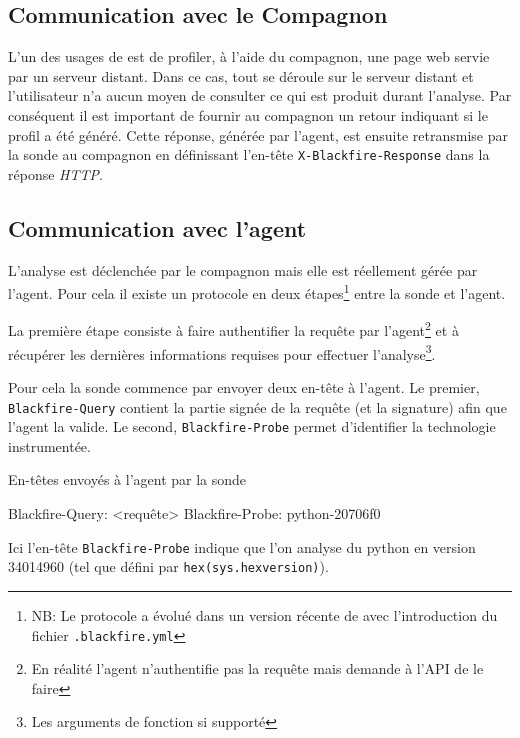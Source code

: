 			\subsection{Communication avec le Compagnon}
			\label{subsec:comm-compagnon}
L'un des usages de \Blackfire est de profiler, à l'aide du compagnon, une page web servie par un serveur distant. Dans ce cas, tout se déroule sur le serveur distant et l'utilisateur n'a aucun moyen de consulter ce qui est produit durant l'analyse. Par conséquent il est important de fournir au compagnon un retour indiquant si le profil a été généré. Cette réponse, générée par l'agent, est ensuite retransmise par la sonde au compagnon en définissant l'en-tête \verb|X-Blackfire-Response| dans la réponse \emph{HTTP}.

			\subsection{Communication avec l'agent}
			\label{subsec:comm-agent}
L'analyse est déclenchée par le compagnon mais elle est réellement gérée par l'agent. Pour cela il existe un protocole en deux étapes\footnote{NB: Le protocole a évolué dans un version récente de \Blackfire avec l'introduction du fichier \verb?.blackfire.yml?} entre la sonde et l'agent.

La première étape consiste à faire authentifier la requête par l'agent\footnote{En réalité l'agent n'authentifie pas la requête mais demande à l'API de le faire} et à récupérer les dernières informations requises pour effectuer l'analyse\footnote{Les arguments de fonction si supporté}.

Pour cela la sonde commence par envoyer deux en-tête à l'agent. Le premier, \verb|Blackfire-Query| contient la partie signée de la requête (et la signature) afin que l'agent la valide. Le second, \verb|Blackfire-Probe| permet d'identifier la technologie instrumentée.

\begin{listing}[H]
\caption{En-têtes envoyés à l'agent par la sonde}
\begin{textcode}
Blackfire-Query: <requête>
Blackfire-Probe: python-20706f0
\end{textcode}
\end{listing}
Ici l'en-tête  \verb|Blackfire-Probe| indique que l'on analyse du python en version 34014960 (tel que défini par \texttt{hex(sys.hexversion)}).

